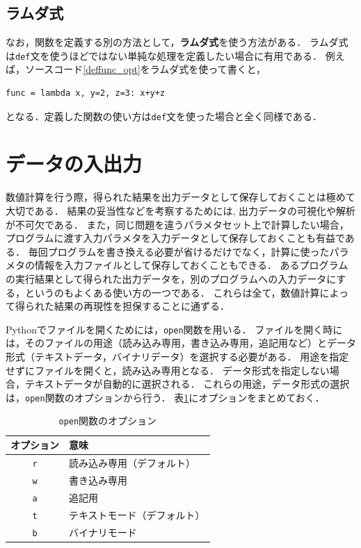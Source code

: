 \documentclass[a4paper,12pt]{jsarticle}
\begin{document}
\subsection{ラムダ式}

なお，関数を定義する別の方法として，{\bf ラムダ式}を使う方法がある．
ラムダ式は\texttt{def}文を使うほどではない単純な処理を定義したい場合に有用である．
例えば，ソースコード\ref{deffunc_opt}をラムダ式を使って書くと，
\begin{lstlisting}[caption=ラムダ式の使い方,label=lambda]
func = lambda x, y=2, z=3: x+y+z
\end{lstlisting}
となる．定義した関数の使い方は\texttt{def}文を使った場合と全く同様である．


\section{データの入出力}

数値計算を行う際，得られた結果を出力データとして保存しておくことは極めて大切である．
結果の妥当性などを考察するためには, 出力データの可視化や解析が不可欠である． 
また，同じ問題を違うパラメタセット上で計算したい場合，プログラムに渡す入力パラメタを入力データとして保存しておくことも有益である．
毎回プログラムを書き換える必要が省けるだけでなく，計算に使ったパラメタの情報を入力ファイルとして保存しておくこともできる．
あるプログラムの実行結果として得られた出力データを，別のプログラムへの入力データにする，というのもよくある使い方の一つである．
これらは全て，数値計算によって得られた結果の再現性を担保することに通ずる．

Pythonでファイルを開くためには，\texttt{open}関数を用いる．
ファイルを開く時には，そのファイルの用途（読み込み専用，書き込み専用，追記用など）とデータ形式（テキストデータ，バイナリデータ）を選択する必要がある．
用途を指定せずにファイルを開くと，読み込み専用となる．
データ形式を指定しない場合，テキストデータが自動的に選択される．
これらの用途，データ形式の選択は，\texttt{open}関数のオプションから行う．
表\ref{tab:data_mode}にオプションをまとめておく．

\begin{table}[H]
    \centering
    \caption{\texttt{open}関数のオプション}
    \begin{tabular}{c|l}
        \hline
        オプション & 意味 \\
        \hline\hline
        \texttt{r} & 読み込み専用（デフォルト） \\
        \texttt{w} & 書き込み専用 \\
        \texttt{a} & 追記用 \\
        \texttt{t} & テキストモード（デフォルト） \\
        \texttt{b} & バイナリモード \\
        \hline
    \end{tabular}
    \label{tab:data_mode}
\end{table}
\end{document}

